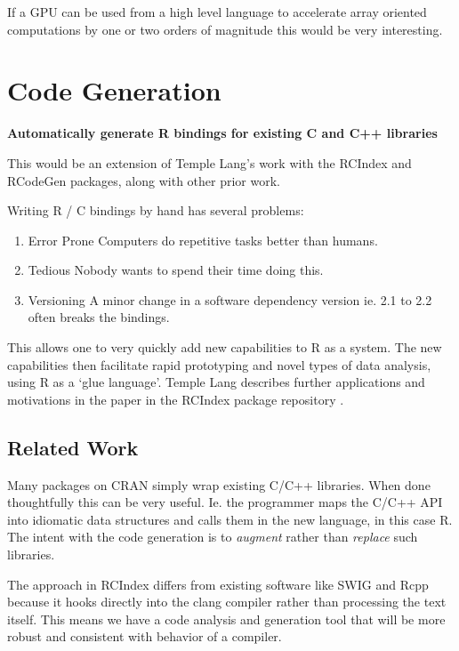 \documentclass[12pt]{article}
\begin{document}
If a GPU can be used from a high level language to accelerate array
oriented computations by one or two orders of magnitude this would be very
interesting.

\section{Code Generation}

\textbf{Automatically generate R bindings for existing C and C++ libraries}

This would be an extension of Temple Lang's
work with the RCIndex \cite{R-RCIndex} and RCodeGen \cite{R-RCodegen}
packages, along with other prior work.

Writing R / C bindings by hand has several problems: 
\begin{enumerate}
    \item{Error Prone} Computers do repetitive tasks better than humans.
    \item{Tedious} Nobody wants to spend their time doing this.
    \item{Versioning} A minor change in a software dependency version ie. 2.1
        to 2.2 often breaks the bindings.
\end{enumerate}

This allows one to very quickly add new
capabilities to R as a system. The new capabilities then facilitate rapid
prototyping and novel types of data analysis, using R as a `glue language'.
Temple Lang describes further applications and motivations in the paper in
the RCIndex package repository \cite{R-RCIndex}.

\subsection{Related Work}

Many packages on CRAN simply wrap existing C/C++ libraries. When done
thoughtfully this can be very useful. Ie. the programmer maps the C/C++ API
into idiomatic data structures and calls them in the new language, in this
case R.  The intent with the code generation is to \emph{augment} rather
than \emph{replace} such libraries. 

The approach in RCIndex differs from existing software like SWIG
\cite{swig} and Rcpp \cite{R-Rcpp} because it hooks directly into the clang
compiler rather than processing the text itself. This means we have a code
analysis and generation tool that will be more robust and consistent with
behavior of a compiler. 
\end{document}
